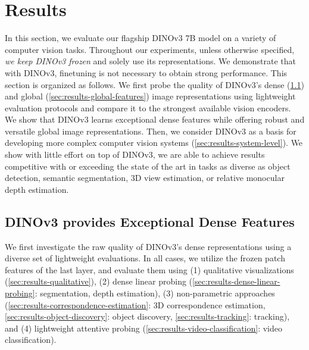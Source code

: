 \section{Results}
\label{sec:results}

In this section, we evaluate our flagship DINOv3 7B model on a variety of computer vision tasks.
Throughout our experiments, unless otherwise specified, \emph{we keep DINOv3 frozen} and solely use its representations.
We demonstrate that with DINOv3, finetuning is not necessary to obtain strong performance.
This section is organized as follows. We first probe the quality of DINOv3's dense (\cref{sec:results-dense-features}) and global (\cref{sec:results-global-features}) image representations using lightweight evaluation protocols and compare it to the strongest available vision encoders. 
We show that DINOv3 learns exceptional dense features while offering robust and versatile global image representations.
Then, we consider DINOv3 as a basis for developing more complex computer vision systems (\cref{sec:results-system-level}).
We show with little effort on top of DINOv3, we are able to achieve results competitive with or exceeding the state of the art in tasks as diverse as object detection, semantic segmentation, 3D view estimation, or relative monocular depth estimation.

\subsection{DINOv3 provides Exceptional Dense Features}
\label{sec:results-dense-features}
We first investigate the raw quality of DINOv3's dense representations using a diverse set of lightweight evaluations.
In all cases, we utilize the frozen patch features of the last layer, and evaluate them using 
(1) qualitative visualizations (\cref{sec:results-qualitative}), 
(2) dense linear probing (\cref{sec:results-dense-linear-probing}: segmentation, depth estimation),
(3) non-parametric approaches (\cref{sec:results-correspondence-estimation}: 3D correspondence estimation, \cref{sec:results-object-discovery}: object discovery, \cref{sec:results-tracking}: tracking), 
and (4) lightweight attentive probing (\cref{sec:results-video-classification}: video classification).

